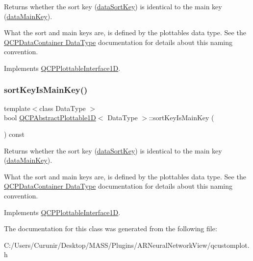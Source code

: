 Returns whether the sort key (\hyperlink{class_q_c_p_abstract_plottable1_d_a6fce4e684f33a31c45928899b5d9ab4b}{data\+Sort\+Key}) is identical to the main key (\hyperlink{class_q_c_p_abstract_plottable1_d_ab14ab428595856bf76e04499017fa8dc}{data\+Main\+Key}).

What the sort and main keys are, is defined by the plottable\textquotesingle{}s data type. See the \hyperlink{class_q_c_p_data_container_qcpdatacontainer-datatype}{Q\+C\+P\+Data\+Container Data\+Type} documentation for details about this naming convention. 

Implements \hyperlink{class_q_c_p_plottable_interface1_d_a229e65e7ab968dd6cd0e259fa504b79d}{Q\+C\+P\+Plottable\+Interface1D}.

\mbox{\label{class_q_c_p_abstract_plottable1_d_a022e8905f5a667d8379493d6a037e79f}} 
\subsubsection{\texorpdfstring{sort\+Key\+Is\+Main\+Key()}{sortKeyIsMainKey()}\hspace{0.1cm}{\footnotesize\ttfamily [2/2]}}
{\footnotesize\ttfamily template$<$class Data\+Type $>$ \\
bool \hyperlink{class_q_c_p_abstract_plottable1_d}{Q\+C\+P\+Abstract\+Plottable1D}$<$ Data\+Type $>$\+::sort\+Key\+Is\+Main\+Key (\begin{DoxyParamCaption}{ }\end{DoxyParamCaption}) const\hspace{0.3cm}{\ttfamily [virtual]}}





Returns whether the sort key (\hyperlink{class_q_c_p_abstract_plottable1_d_a6fce4e684f33a31c45928899b5d9ab4b}{data\+Sort\+Key}) is identical to the main key (\hyperlink{class_q_c_p_abstract_plottable1_d_ab14ab428595856bf76e04499017fa8dc}{data\+Main\+Key}).

What the sort and main keys are, is defined by the plottable\textquotesingle{}s data type. See the \hyperlink{class_q_c_p_data_container_qcpdatacontainer-datatype}{Q\+C\+P\+Data\+Container Data\+Type} documentation for details about this naming convention. 

Implements \hyperlink{class_q_c_p_plottable_interface1_d_a229e65e7ab968dd6cd0e259fa504b79d}{Q\+C\+P\+Plottable\+Interface1D}.



The documentation for this class was generated from the following file\+:\begin{DoxyCompactItemize}
\item 
C\+:/\+Users/\+Curunir/\+Desktop/\+M\+A\+S\+S/\+Plugins/\+A\+R\+Neural\+Network\+View/qcustomplot.\+h\end{DoxyCompactItemize}

